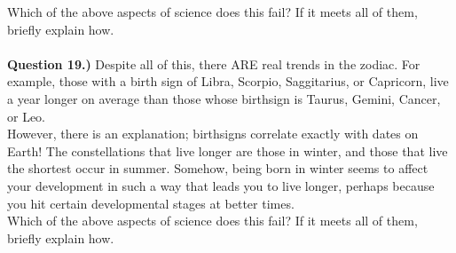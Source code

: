 \documentclass[11pt]{article}
\begin{document}
Which of the above aspects of science does this fail? If it meets all of them, briefly explain how.\\

\vspace{1.5cm}
\hrulefill\\

\textbf{Question 19.)} Despite all of this, there ARE real trends in the zodiac. For example, those with a birth sign of Libra, Scorpio, Saggitarius, or Capricorn, live a year longer on average than those whose birthsign is Taurus, Gemini, Cancer, or Leo.\\

However, there is an explanation; birthsigns correlate exactly with dates on Earth! The constellations that live longer are those in winter, and those that live the shortest occur in summer. Somehow, being born in winter seems to affect your development in such a way that leads you to live longer, perhaps because you hit certain developmental stages at better times.\\

Which of the above aspects of science does this fail? If it meets all of them, briefly explain how.

\vspace{1.5cm}
\hrulefill
\end{document}

